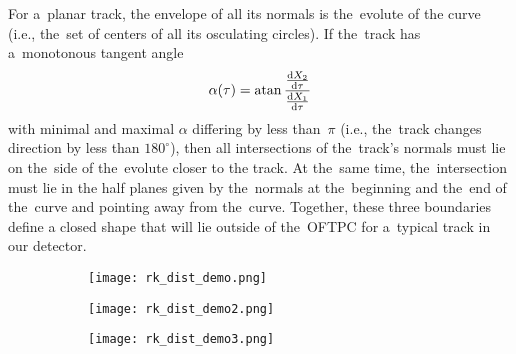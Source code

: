 		For a~planar track, the envelope of all its normals is the~evolute of the curve (i.e., the~set of centers of all its osculating circles). If the~track has a~monotonous tangent angle
			\begin{equation}
				\alpha(\tau) = \atan{\frac{\dv{X_2}{\tau}}{\dv{X_1}{\tau}}}
			\end{equation}
		with minimal and maximal $\alpha$ differing by less than~$\pi$ (i.e., the~track changes direction by less than $180^\circ$), then all intersections of the~track's normals must lie on the~side of the~evolute closer to the track. At the~same time, the~intersection must lie in the half planes given by the~normals at the~beginning and the~end of the~curve and pointing away from the~curve. Together, these three boundaries define a closed shape that will lie outside of the~\ac{OFTPC} for a~typical track in our detector.
			\begin{figure}
				\centering
				\begin{subfigure}[t]{0.49\textwidth}
					\centering
					\texttt{[image: rk\_dist\_demo.png]}
				\end{subfigure}
				\hfill
				\begin{subfigure}[t]{0.49\textwidth}
					\centering
					\texttt{[image: rk\_dist\_demo2.png]}
				\end{subfigure}
				\hfill
				\begin{subfigure}[t]{0.49\textwidth}
					\centering
					\texttt{[image: rk\_dist\_demo3.png]}
				\end{subfigure}
				\caption{}
				\label{fig:rkdemo2}
			\end{figure}
		
